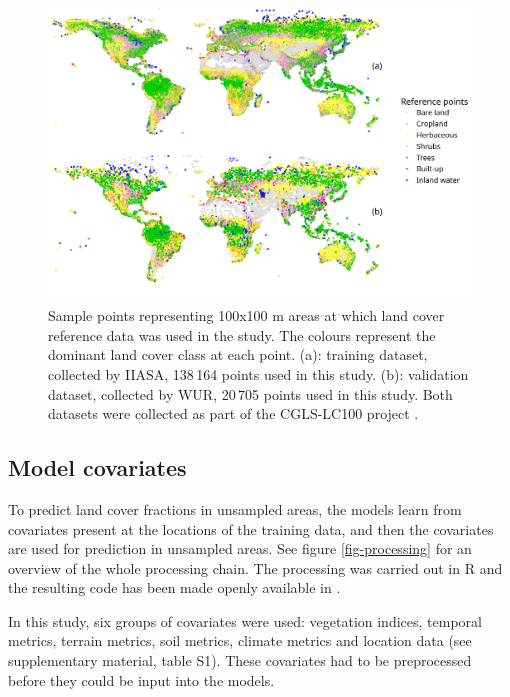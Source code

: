 \documentclass[review,authoryear,3p]{elsarticle}
\begin{document}
\begin{figure}
 \includegraphics[width=\textwidth]{article-figures/maps/2020-07-06-training-and-validation}
 \caption{Sample points representing 100x100 m areas at which land cover reference data was used in the study. The colours represent the dominant land cover class at each point. (a): training dataset, collected by \gls{IIASA}, 138\,164 points used in this study. (b): validation dataset, collected by \gls{WUR}, 20\,705 points used in this study. Both datasets were collected as part of the \ac{CGLS-LC100} project \citep{buchhorn_copernicus_2020}.}
 \label{fig-reference-data}
\end{figure}

\subsection{Model covariates}

To predict land cover fractions in unsampled areas, the models learn from covariates present at the locations of the training data, and then the covariates are used for prediction in unsampled areas.
See figure \ref{fig-processing} for an overview of the whole processing chain.
The processing was carried out in R \citep{r_2019} and the resulting code has been made openly available in \citet{dainius_masiliunas_2020_3973123}.

In this study, six groups of covariates were used: vegetation indices, temporal metrics, terrain metrics, soil metrics, climate metrics and location data (see supplementary material, table S1).
These covariates had to be preprocessed before they could be input into the models.
\end{document}
